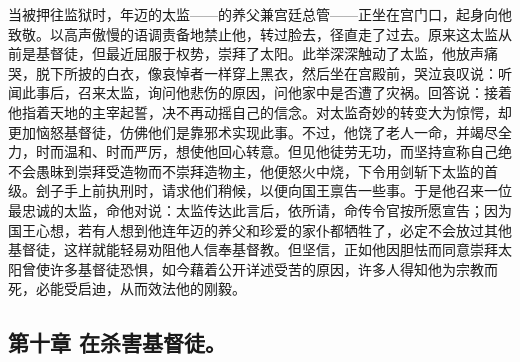 当被押往监狱时，年迈的太监——的养父兼宫廷总管——正坐在宫门口，起身向他致敬。以高声傲慢的语调责备地禁止他，转过脸去，径直走了过去。原来这太监从前是基督徒，但最近屈服于权势，崇拜了太阳。此举深深触动了太监，他放声痛哭，脱下所披的白衣，像哀悼者一样穿上黑衣，然后坐在宫殿前，哭泣哀叹说：听闻此事后，召来太监，询问他悲伤的原因，问他家中是否遭了灾祸。回答说：接着他指着天地的主宰起誓，决不再动摇自己的信念。对太监奇妙的转变大为惊愕，却更加恼怒基督徒，仿佛他们是靠邪术实现此事。不过，他饶了老人一命，并竭尽全力，时而温和、时而严厉，想使他回心转意。但见他徒劳无功，而坚持宣称自己绝不会愚昧到崇拜受造物而不崇拜造物主，他便怒火中烧，下令用剑斩下太监的首级。刽子手上前执刑时，请求他们稍候，以便向国王禀告一些事。于是他召来一位最忠诚的太监，命他对说：太监传达此言后，依所请，命传令官按所愿宣告；因为国王心想，若有人想到他连年迈的养父和珍爱的家仆都牺牲了，必定不会放过其他基督徒，这样就能轻易劝阻他人信奉基督教。但坚信，正如他因胆怯而同意崇拜太阳曾使许多基督徒恐惧，如今藉着公开详述受苦的原因，许多人得知他为宗教而死，必能受启迪，从而效法他的刚毅。\par


\subsection{第十章 在杀害基督徒。}

